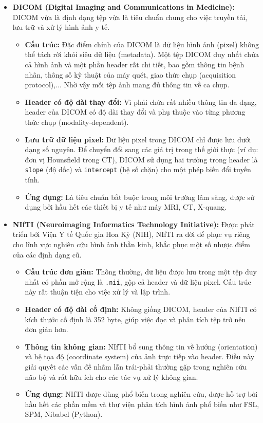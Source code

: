 \begin{itemize}
    \item \textbf{DICOM (Digital Imaging and Communications in Medicine):} 
    DICOM vừa là định dạng tệp vừa là tiêu chuẩn chung cho việc truyền tải, lưu trữ và xử lý hình ảnh y tế. 
    \begin{itemize}
        \item[$\circ$]  \textbf{Cấu trúc:} Đặc điểm chính của DICOM là dữ liệu hình ảnh (pixel) không thể tách rời khỏi siêu dữ liệu (metadata). Một tệp DICOM duy nhất chứa cả hình ảnh và một phần header rất chi tiết, bao gồm thông tin bệnh nhân, thông số kỹ thuật của máy quét, giao thức chụp (acquisition protocol),... Nhờ vậy mỗi tệp ảnh mang đủ thông tin về ca chụp.
        \item[$\circ$]  \textbf{Header có độ dài thay đổi:} Vì phải chứa rất nhiều thông tin đa dạng, header của DICOM có độ dài thay đổi và phụ thuộc vào từng phương thức chụp (modality-dependent).
        \item[$\circ$]  \textbf{Lưu trữ dữ liệu pixel:} Dữ liệu pixel trong DICOM chỉ được lưu dưới dạng số nguyên. Để chuyển đổi sang các giá trị trong thế giới thực (ví dụ: đơn vị Hounsfield trong CT), DICOM sử dụng hai trường trong header là \texttt{slope} (độ dốc) và \texttt{intercept} (hệ số chặn) cho một phép biến đổi tuyến tính.
        \item[$\circ$] \textbf{Ứng dụng:} Là tiêu chuẩn bắt buộc trong môi trường lâm sàng, được sử dụng bởi hầu hết các thiết bị y tế như máy MRI, CT, X-quang.
    \end{itemize}
    
    \item \textbf{NIfTI (Neuroimaging Informatics Technology Initiative):} 
    Được phát triển bởi Viện Y tế Quốc gia Hoa Kỳ (NIH), NIfTI ra đời để phục vụ riêng cho lĩnh vực nghiên cứu hình ảnh thần kinh, khắc phục một số nhược điểm của các định dạng cũ.
    \begin{itemize}
        \item[$\circ$] \textbf{Cấu trúc đơn giản:} Thông thường, dữ liệu được lưu trong một tệp duy nhất có phần mở rộng là \texttt{.nii}, gộp cả header và dữ liệu pixel. Cấu trúc này rất thuận tiện cho việc xử lý và lập trình.
        \item[$\circ$] \textbf{Header có độ dài cố định:} Không giống DICOM, header của NIfTI có kích thước cố định là 352 byte, giúp việc đọc và phân tích tệp trở nên đơn giản hơn.
        \item[$\circ$] \textbf{Thông tin không gian:} NIfTI bổ sung thông tin về hướng (orientation) và hệ tọa độ (coordinate system) của ảnh trực tiếp vào header. Điều này giải quyết các vấn đề nhầm lẫn trái-phải thường gặp trong nghiên cứu não bộ và rất hữu ích cho các tác vụ xử lý không gian.
        \item[$\circ$] \textbf{Ứng dụng:} NIfTI được dùng phổ biến trong nghiên cứu, được hỗ trợ bởi hầu hết các phần mềm và thư viện phân tích hình ảnh phổ biến như FSL, SPM, Nibabel (Python).
    \end{itemize}
\end{itemize}
